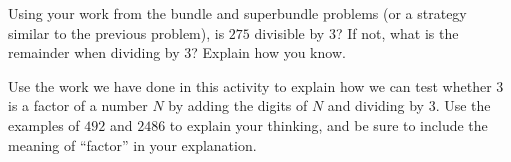 \documentclass[nooutcomes,noauthor]{ximera}
\begin{document}
\begin{problem}
Using your work from the bundle and superbundle problems (or a strategy similar to the previous problem), is $275$ divisible by $3$? If not, what is the remainder when dividing by $3$? Explain how you know.

\begin{image} \end{image}


\end{problem}



\begin{problem}
Use the work we have done in this activity to explain how we can test whether $3$ is a factor of a number $N$ by adding the digits of $N$ and dividing by $3$. Use the examples of $492$ and $2486$ to explain your thinking, and be sure to include the meaning of ``factor'' in your explanation.
\end{problem}




\newpage
\end{document}
